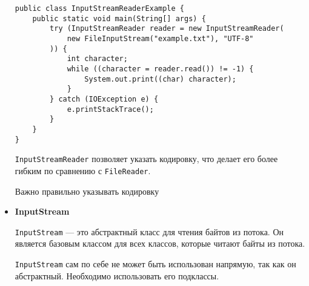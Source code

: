 \begin{itemize}
\begin{verbatim}
public class InputStreamReaderExample {
    public static void main(String[] args) {
        try (InputStreamReader reader = new InputStreamReader(
            new FileInputStream("example.txt"), "UTF-8"
        )) {
            int character;
            while ((character = reader.read()) != -1) {
                System.out.print((char) character);
            }
        } catch (IOException e) {
            e.printStackTrace();
        }
    }
}
    \end{verbatim}
    \texttt{InputStreamReader} позволяет указать кодировку, что делает его более гибким по сравнению с \texttt{FileReader}.\par
    Важно правильно указывать кодировку
    
    \item \textbf{InputStream} \par
    \texttt{InputStream} — это абстрактный класс для чтения байтов из потока. Он является базовым классом для всех классов, которые читают байты из потока. \par
    \texttt{InputStream} сам по себе не может быть использован напрямую, так как он абстрактный. Необходимо использовать его подклассы.
\end{itemize}

